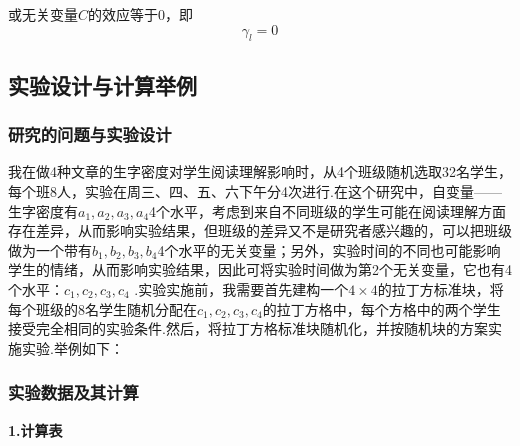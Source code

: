 或无关变量$C$的效应等于0，即
\[ \gamma _l = 0 \]


 \subsection{实验设计与计算举例}
 \subsubsection{研究的问题与实验设计}
我在做4种文章的生字密度对学生阅读理解影响时，从4个班级随机选取32名学生，每个班8人，实验在周三、四、五、六下午分4次进行.在这个研究中，自变量——生字密度有$a_1,a_2,a_3,a_4$4个水平，考虑到来自不同班级的学生可能在阅读理解方面存在差异，从而影响实验结果，但班级的差异又不是研究者感兴趣的，可以把班级做为一个带有$b_1,b_2,b_3,b_4$4个水平的无关变量；另外，实验时间的不同也可能影响学生的情绪，从而影响实验结果，因此可将实验时间做为第2个无关变量，它也有4个水平：$c_1,c_2,c_3,c_4$ .实验实施前，我需要首先建构一个$4 \times 4$的拉丁方标准块，将每个班级的8名学生随机分配在$c_1,c_2,c_3,c_4$的拉丁方格中，每个方格中的两个学生接受完全相同的实验条件.然后，将拉丁方格标准块随机化，并按随机块的方案实施实验.举例如下：


 
 \subsubsection{实验数据及其计算}

\textbf{1.计算表}


